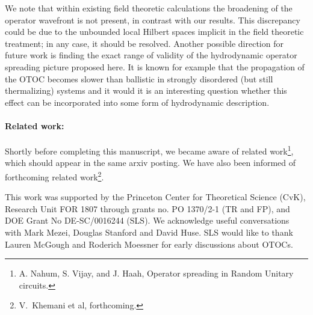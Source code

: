 \documentclass[aps,prb,twocolumn,superscriptaddress]{revtex4-1}
\begin{document}
We note that within existing field theoretic calculations \cite{Stanford2016,Aleiner16,Swingle17} the broadening of the operator wavefront is not present, in contrast with our results. This discrepancy could be due to the unbounded local Hilbert spaces implicit in the field theoretic treatment; in any case, it should be resolved. Another possible direction for future work is finding the exact range of validity of the hydrodynamic operator spreading picture proposed here. It is known for example that the propagation of the OTOC becomes slower than ballistic in strongly disordered (but still thermalizing) systems\cite{Luitz17} and it would it is an interesting question whether this effect can be incorporated into some form of hydrodynamic description.

\paragraph*{Related work:} Shortly before completing this manuscript, we became aware of related work\footnote{A. Nahum, S. Vijay, and J. Haah, Operator spreading in Random Unitary circuits.}, which should appear in the same arxiv posting. We have also been informed of forthcoming related work\footnote{V.~Khemani et al, forthcoming.}.

\acknowledgements
This work was supported by the Princeton Center for Theoretical Science (CvK), Research Unit FOR 1807 through grants no. PO 1370/2-1 (TR and FP), and DOE Grant No DE-SC/0016244 (SLS). We acknowledge useful conversations with Mark Mezei, Douglas Stanford and David Huse. SLS would like to thank Lauren McGough and Roderich Moessner for early discussions about OTOCs. 




\appendix
\end{document}
